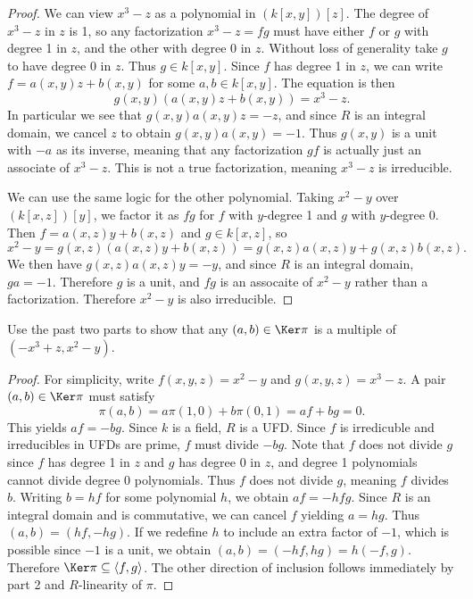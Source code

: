 \documentclass[11pt, letterpaper]{article}
\begin{document}
\begin{proof}
	We can view $x^3-z$ as a polynomial in $(k[x,y])[z]$. The degree of $x^3-z$ in $z$ is 1, so any factorization $x^3-z=fg$ must have either $f$ or $g$ with degree 1 in $z$, and the other with degree 0 in $z$. Without loss of generality take $g$ to have degree 0 in $z$. Thus $g\in k[x,y]$. Since $f$ has degree 1 in $z$, we can write $f=a(x,y)z+b(x,y)$ for some $a,b\in k[x,y]$. The equation is then
	\[
		g(x,y)\left( a(x,y)z+b(x,y) \right) =x^3-z
	.\]
	In particular we see that $g(x,y)a(x,y)z=-z$, and since $R$ is an integral domain, we cancel $z$ to obtain $g(x,y)a(x,y)=-1$. Thus $g(x,y)$ is a unit with $-a$ as its inverse, meaning that any factorization $gf$ is actually just an associate of $x^3-z$. This is not a true factorization, meaning $x^3-z$ is irreducible.

	We can use the same logic for the other polynomial. Taking $x^2-y$ over $(k[x,z])[y]$, we factor it as $fg$ for $f$ with $y$-degree 1 and $g$ with $y$-degree 0. Then $f=a(x,z)y+b(x,z)$ and $g\in k[x,z]$, so
	\[
		x^2-y = g(x,z)\left( a(x,z)y+b(x,z) \right) =g(x,z)a(x,z)y + g(x,z)b(x,z)
	.\]
	We then have $g(x,z)a(x,z)y = -y$, and since $R$ is an integral domain, $ga=-1$. Therefore $g$ is a unit, and $fg$ is an assocaite of $x^2-y$ rather than a factorization. Therefore $x^2-y$ is also irreducible.
\end{proof}
\begin{problem}
	Use the past two parts to show that any $(a,b)\in \Ker \pi $ is a multiple of $(-x^3+z,x^2-y)$.
\end{problem}
\begin{proof}
	For simplicity, write $f(x,y,z)=x^2-y$ and $g(x,y,z)=x^3-z$. A pair $(a,b)\in \Ker \pi $ must satisfy
	\[
		\pi (a,b)=a\pi (1,0)+b\pi (0,1)=af+bg=0
	.\]
	This yields $af=-bg$. Since $k$ is a field, $R$ is a UFD. Since $f$ is irredicuble and irreducibles in UFDs are prime, $f$ must divide $-bg$. Note that $f$ does not divide $g$ since $f$ has degree 1 in $z$ and $g$ has degree 0 in $z$, and degree 1 polynomials cannot divide degree 0 polynomials. Thus $f$ does not divide $g$, meaning $f$ divides $b$. Writing $b=hf$ for some polynomial $h$, we obtain $af=-hfg$. Since $R$ is an integral domain and is commutative, we can cancel $f$ yielding $a=hg$. Thus $(a,b)=(hf,-hg)$. If we redefine $h$ to include an extra factor of $-1$, which is possible since $-1$ is a unit, we obtain $(a,b)=(-hf,hg)=h(-f,g)$. Therefore $\Ker \pi \subseteq \left\langle f,g \right\rangle $. The other direction of inclusion follows immediately by part 2 and $R$-linearity of $\pi $.
\end{proof}
\end{document}

